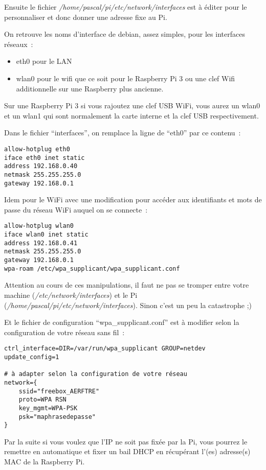 Ensuite le fichier \emph{/home/pascal/pi/etc/network/interfaces} est à éditer pour le personnaliser et donc donner une adresse fixe au Pi.

On retrouve les noms d'interface de debian, assez simples, pour les interfaces réseaux~: 
\begin{itemize}
	\item eth0 pour le LAN
	\item wlan0 pour le wifi que ce soit pour le Raspberry Pi 3 ou une clef Wifi additionnelle sur une Raspberry plus ancienne.
\end{itemize}

Sur une Raspberry Pi 3 si vous rajoutez une clef USB WiFi, vous aurez un wlan0 et un wlan1 qui sont normalement la carte interne et la clef USB respectivement.

Dans le fichier ``interfaces'', on remplace la ligne de ``eth0'' par ce contenu~:
\begin{verbatim}
allow-hotplug eth0
iface eth0 inet static
address 192.168.0.40
netmask 255.255.255.0
gateway 192.168.0.1
\end{verbatim}

Idem pour le WiFi avec une modification pour accéder aux identifiants et mots de passe du réseau WiFi auquel on se connecte~:
\begin{verbatim}
allow-hotplug wlan0
iface wlan0 inet static
address 192.168.0.41
netmask 255.255.255.0
gateway 192.168.0.1
wpa-roam /etc/wpa_supplicant/wpa_supplicant.conf
\end{verbatim}

Attention au cours de ces manipulations, il faut ne pas se tromper entre votre machine (\emph{/etc/network/interfaces}) et le Pi (\emph{/home/pascal/pi/etc/network/interfaces}). Sinon c'est un peu la catastrophe ;)

Et le fichier de configuration ``wpa\_supplicant.conf'' est à modifier selon la configuration de votre réseau sans fil~:

\begin{verbatim}
ctrl_interface=DIR=/var/run/wpa_supplicant GROUP=netdev
update_config=1

# à adapter selon la configuration de votre réseau
network={
    ssid="freebox_AERFTRE"		
    proto=WPA RSN				
    key_mgmt=WPA-PSK			
    psk="maphrasedepasse"		
}
\end{verbatim}

Par la suite si vous voulez que l'IP ne soit pas fixée par la Pi, vous pourrez le remettre en automatique et fixer un bail DHCP en récupérant l'(es) adresse(s) MAC de la Raspberry Pi.


